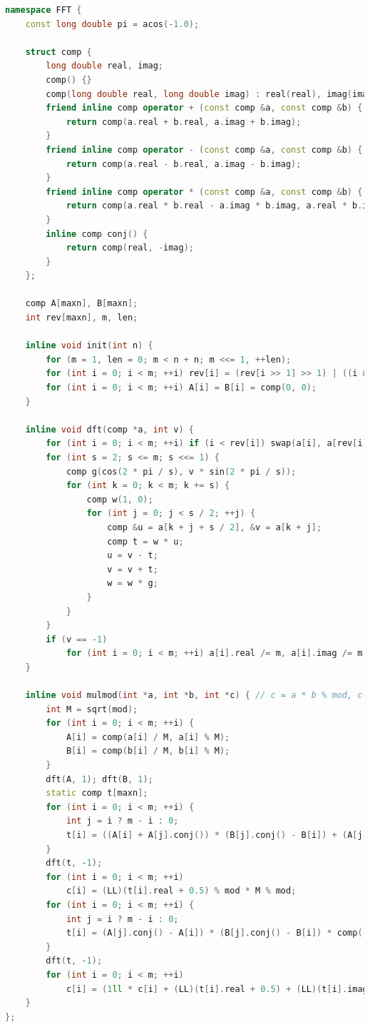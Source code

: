 \documentclass{article}
\begin{document}
\begin{lstlisting}[language=C++]
namespace FFT {
	const long double pi = acos(-1.0);

	struct comp {
		long double real, imag;
		comp() {}
		comp(long double real, long double imag) : real(real), imag(imag) {}
		friend inline comp operator + (const comp &a, const comp &b) {
			return comp(a.real + b.real, a.imag + b.imag);
		}
		friend inline comp operator - (const comp &a, const comp &b) {
			return comp(a.real - b.real, a.imag - b.imag);
		}
		friend inline comp operator * (const comp &a, const comp &b) {
			return comp(a.real * b.real - a.imag * b.imag, a.real * b.imag + a.imag * b.real);
		}
		inline comp conj() {
			return comp(real, -imag);
		}
	};

	comp A[maxn], B[maxn];
	int rev[maxn], m, len;

	inline void init(int n) {
		for (m = 1, len = 0; m < n + n; m <<= 1, ++len);
		for (int i = 0; i < m; ++i) rev[i] = (rev[i >> 1] >> 1) | ((i & 1) << (len - 1));
		for (int i = 0; i < m; ++i) A[i] = B[i] = comp(0, 0);
	}

	inline void dft(comp *a, int v) {
		for (int i = 0; i < m; ++i) if (i < rev[i]) swap(a[i], a[rev[i]]);
		for (int s = 2; s <= m; s <<= 1) {
			comp g(cos(2 * pi / s), v * sin(2 * pi / s));
			for (int k = 0; k < m; k += s) {
				comp w(1, 0);
				for (int j = 0; j < s / 2; ++j) {
					comp &u = a[k + j + s / 2], &v = a[k + j];
					comp t = w * u;
					u = v - t;
					v = v + t;
					w = w * g;
				}
			}
		}
		if (v == -1)
			for (int i = 0; i < m; ++i) a[i].real /= m, a[i].imag /= m;
	}

	inline void mulmod(int *a, int *b, int *c) { // c = a * b % mod, c不能为a或b
		int M = sqrt(mod);
		for (int i = 0; i < m; ++i) {
			A[i] = comp(a[i] / M, a[i] % M);
			B[i] = comp(b[i] / M, b[i] % M);
		}	
		dft(A, 1); dft(B, 1);
		static comp t[maxn];
		for (int i = 0; i < m; ++i) {
			int j = i ? m - i : 0;
			t[i] = ((A[i] + A[j].conj()) * (B[j].conj() - B[i]) + (A[j].conj() - A[i]) * (B[i] + B[j].conj())) * comp(0, 0.25);
		}
		dft(t, -1);
		for (int i = 0; i < m; ++i)
			c[i] = (LL)(t[i].real + 0.5) % mod * M % mod;
		for (int i = 0; i < m; ++i) {
			int j = i ? m - i : 0;
			t[i] = (A[j].conj() - A[i]) * (B[j].conj() - B[i]) * comp(-0.25, 0) + comp(0, 0.25) * (A[i] + A[j].conj()) * (B[i] + B[j].conj());
		}
		dft(t, -1);
		for (int i = 0; i < m; ++i)
			c[i] = (1ll * c[i] + (LL)(t[i].real + 0.5) + (LL)(t[i].imag + 0.5) % mod * M * M % mod) % mod;
	}
};
\end{lstlisting}
\end{document}
